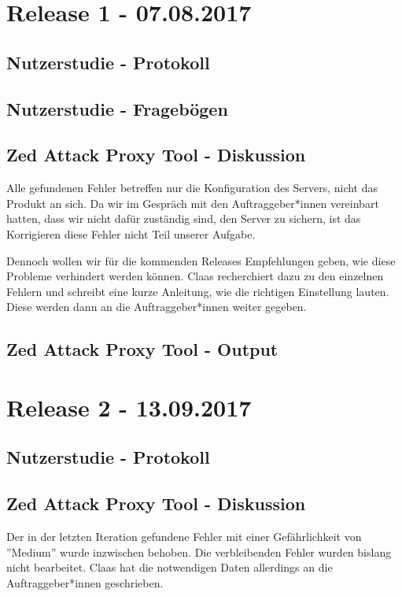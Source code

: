 \documentclass[accentcolor=tud0b,12pt,paper=a4]{tudreport}
\begin{document}
\section{Release 1 - 07.08.2017}

	\subsection*{Nutzerstudie - Protokoll}
	

	\subsection*{Nutzerstudie - Fragebögen}


	\subsection*{Zed Attack Proxy Tool - Diskussion}
	Alle gefundenen Fehler betreffen nur die Konfiguration des Servers, nicht das Produkt an sich. Da wir im Gespräch mit den Auftraggeber*innen vereinbart hatten, dass wir nicht dafür zuständig sind, den Server zu sichern, ist das Korrigieren diese Fehler nicht Teil unserer Aufgabe.

	Dennoch wollen wir für die kommenden Releases Empfehlungen geben, wie diese Probleme verhindert werden können. Claas recherchiert dazu zu den einzelnen Fehlern und schreibt eine kurze Anleitung, wie die richtigen Einstellung lauten. Diese werden dann an die Auftraggeber*innen weiter gegeben.

	\subsection*{Zed Attack Proxy Tool - Output}
	

\section{Release 2 - 13.09.2017}

	\subsection*{Nutzerstudie - Protokoll}
	

	\subsection*{Zed Attack Proxy Tool - Diskussion}
	Der in der letzten Iteration gefundene Fehler mit einer Gefährlichkeit von ''Medium'' wurde inzwischen behoben. Die verbleibenden Fehler wurden bislang nicht bearbeitet. Claas hat die notwendigen Daten allerdings an die Auftraggeber*innen geschrieben.
\end{document}
